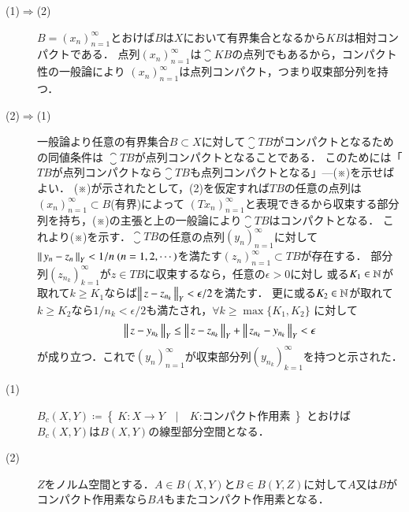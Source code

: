 	\begin{prf}\mbox{}
		\begin{description}
			\item[(1)$\Rightarrow$(2)]
				$B = (x_n)_{n=1}^{\infty}$とおけば$B$は$X$において有界集合となるから$KB$は相対コンパクトである．
				点列$(x_n)_{n=1}^{\infty}$は$\closure{KB}$の点列でもあるから，コンパクト性の一般論により
				$(x_n)_{n=1}^{\infty}$は点列コンパクト，つまり収束部分列を持つ．
			\item[(2)$\Rightarrow$(1)]
				一般論より任意の有界集合$B \subset X$に対して$\closure{TB}$がコンパクトとなるための同値条件は
				$\closure{TB}$が点列コンパクトとなることである．
				このためには「$TB$が点列コンパクトなら$\closure{TB}$も点列コンパクトとなる」---(※)を示せばよい．
				(※)が示されたとして，(2)を仮定すれば$TB$の任意の点列は$(x_n)_{n=1}^{\infty} \subset B$(有界)によって
				$(Tx_n)_{n=1}^{\infty}$と表現できるから収束する部分列を持ち，(※)の主張と上の一般論により$\closure{TB}$はコンパクトとなる．
				これより(※)を示す．$\closure{TB}$の任意の点列$(y_n)_{n=1}^{\infty}$に対して
				$\Norm{y_n - z_n}{Y} < 1/n\ (n=1,2,\cdots)$を満たす$(z_n)_{n=1}^{\infty} \subset TB$が存在する．
				部分列$(z_{n_k})_{k=1}^{\infty}$が$z \in TB$に収束するなら，任意の$\epsilon > 0$に対し
				或る$K_1 \in \mathbb{N}$が取れて$k \geq K_1$ならば$\left\|\, z - z_{n_k}\, \right\|_{Y} < \epsilon/2$を満たす．
				更に或る$K_2 \in \mathbb{N}$が取れて$k \geq K_2$なら$1/n_k < \epsilon/2$も満たされ，$\forall k \geq \max{}{\{K_1,K_2\}}$
				に対して
				\begin{align}
					\left\|\, z - y_{n_k}\, \right\|_{Y} \leq \left\|\, z - z_{n_k}\, \right\|_{Y} + \left\|\, z_{n_k} - y_{n_k}\, \right\|_{Y} < \epsilon
				\end{align}
				が成り立つ．これで$(y_n)_{n=1}^{\infty}$が収束部分列$(y_{n_k})_{k=1}^{\infty}$を持つと示された．
		\end{description}
		\QED
	\end{prf}
	
	\begin{itembox}[l]{}
		\begin{prp}\mbox{}
			\begin{description}
				\item[(1)] $B_c(X,Y) \coloneqq \left\{\ K:X \rightarrow Y\quad |\quad \mbox{$K$:コンパクト作用素}\ \right\}$
					とおけば$B_c(X,Y)$は$B(X,Y)$の線型部分空間となる．
				\item[(2)] $Z$をノルム空間とする．$A \in B(X,Y)$と$B \in B(Y,Z)$に対して$A$又は$B$がコンパクト作用素なら$BA$もまたコンパクト作用素となる．
			\end{description}
		\end{prp}
	\end{itembox}
	
